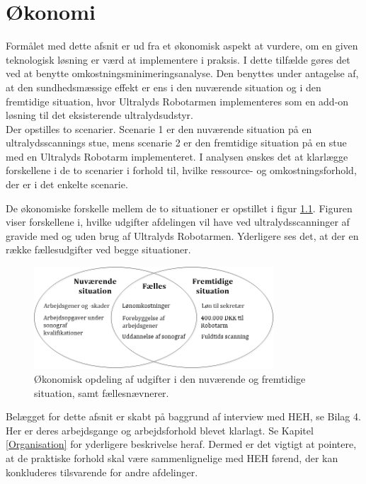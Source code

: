 \chapter{Økonomi} \label{Okonomi}
Formålet med dette afsnit er ud fra et økonomisk aspekt at vurdere, om en given teknologisk løsning er værd at implementere i praksis. I dette tilfælde gøres det ved at benytte omkostningsminimeringsanalyse. Den benyttes under antagelse af, at den sundhedsmæssige effekt er ens i den nuværende situation og i den fremtidige situation, hvor Ultralyds Robotarmen implementeres som en add-on løsning til det eksisterende ultralydsudstyr. \\
Der opstilles to scenarier. Scenarie 1 er den nuværende situation på en ultralydsscannings stue, mens scenarie 2 er den fremtidige situation på en stue med en Ultralyds Robotarm implementeret. I analysen ønskes det at klarlægge forskellene i de to scenarier i forhold til, hvilke ressource- og omkostningsforhold, der er i det enkelte scenarie. 

De økonomiske forskelle mellem de to situationer er opstillet i figur \ref{ModelOkonomi}. Figuren viser forskellene i, hvilke udgifter afdelingen vil have ved ultralydsscanninger af gravide med og uden brug af Ultralyds Robotarmen. Yderligere ses det, at der en række fællesudgifter ved begge situationer.  

\begin{figure}[H]\centering
	\includegraphics[width = 0.8\textwidth]{Figurer/ModelOkonomi}
	\caption{Økonomisk opdeling af udgifter i den nuværende og fremtidige situation, samt fællesnævnerer.}
	\label{ModelOkonomi}
\end{figure}

Belægget for dette afsnit er skabt på baggrund af interview med HEH, se Bilag 4. Her er deres arbejdsgange og arbejdsforhold blevet klarlagt. Se Kapitel \ref{Organisation} for yderligere beskrivelse heraf. Dermed er det vigtigt at pointere, at de praktiske forhold skal være sammenlignelige med HEH førend, der kan konkluderes tilsvarende for andre afdelinger.

